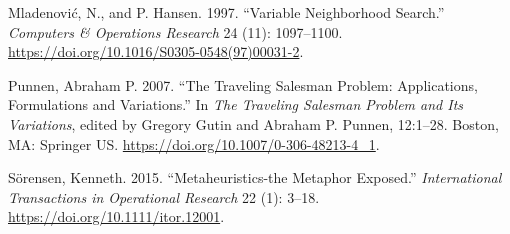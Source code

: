 \documentclass[
]{article}
\begin{document}
\leavevmode\hypertarget{ref-mladenovic_variable_1997}{}%
Mladenović, N., and P. Hansen. 1997. ``Variable Neighborhood Search.''
\emph{Computers \& Operations Research} 24 (11): 1097--1100.
\url{https://doi.org/10.1016/S0305-0548(97)00031-2}.

\leavevmode\hypertarget{ref-du_traveling_2007}{}%
Punnen, Abraham P. 2007. ``The Traveling Salesman Problem: Applications,
Formulations and Variations.'' In \emph{The Traveling Salesman Problem
and Its Variations}, edited by Gregory Gutin and Abraham P. Punnen,
12:1--28. Boston, MA: Springer US.
\url{https://doi.org/10.1007/0-306-48213-4_1}.

\leavevmode\hypertarget{ref-sorensen_metaheuristics-metaphor_2015}{}%
Sörensen, Kenneth. 2015. ``Metaheuristics-the Metaphor Exposed.''
\emph{International Transactions in Operational Research} 22 (1): 3--18.
\url{https://doi.org/10.1111/itor.12001}.
\end{document}
